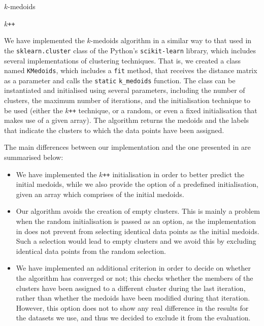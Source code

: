 \begin{algorithm}[h]
\small
\caption[$k$-medoids]{$k$-medoids}
\label{algorithms:k-medoids}

\end{algorithm}

\begin{algorithm}[h]
\small
\caption[$k$\texttt{++}]{$k$\texttt{++}}
\label{algorithms:k++}

\end{algorithm}


We have implemented the $k$-medoids algorithm in a similar way to that used in the \texttt{sklearn.cluster} class of the Python's \texttt{scikit-learn} library, which includes several implementations of clustering techniques. That is, we created a class named \texttt{KMedoids}, which includes a \texttt{fit} method, that receives the distance matrix as a parameter and calls the \texttt{static} \texttt{k\_medoids} function. The class can be instantiated and initialised using several parameters, including the number of clusters, the maximum number of iterations, and the initialisation technique to be used (either the $k$\verb!++! technique, or a random, or even a fixed initialisation that makes use of a given array). The algorithm returns the medoids and the labels that indicate the clusters to which the data points have been assigned.

The main differences between our implementation and the one presented in \cite{Bauckhage:2015} are summarised below:

\begin{itemize}
\item We have implemented the $k$\verb!++! initialisation in order to better predict the initial medoids, while we also provide the option of a predefined initialisation, given an array which comprises of the initial medoids.
\item Our algorithm avoids the creation of empty clusters. This is mainly a problem when the random initialisation is passed as an option, as the implementation in \cite{Bauckhage:2015} does not prevent from selecting identical data points as the initial medoids. Such a selection would lead to empty clusters and we avoid this by excluding identical data points from the random selection.  
\item We have implemented an additional criterion in order to decide on whether the algorithm has converged or not; this checks whether the members of the clusters have been assigned to a different cluster during the last iteration, rather than whether the medoids have been modified during that iteration. However, this option does not to show any real difference in the results for the datasets we use, and thus we decided to exclude it from the evaluation.
\end{itemize}


